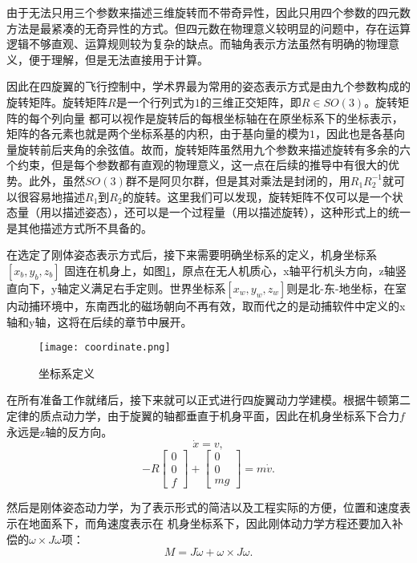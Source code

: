 由于无法只用三个参数来描述三维旋转而不带奇异性，因此只用四个参数的四元数方法是最紧凑的无奇异性的方式。但四元数在物理意义较明显的问题中，存在运算逻辑不够直观、运算规则较为复杂的缺点。而轴角表示方法虽然有明确的物理意义，便于理解，但是无法直接用于计算。

因此在四旋翼的飞行控制中，学术界最为常用的姿态表示方式是由九个参数构成的旋转矩阵。旋转矩阵$R$是一个行列式为$1$的三维正交矩阵，即$R\in SO(3)$。旋转矩阵的每个列向量  都可以视作是旋转后的每根坐标轴在在原坐标系下的坐标表示，矩阵的各元素也就是两个坐标系基的内积，由于基向量的模为$1$，因此也是各基向量旋转前后夹角的余弦值。故而，旋转矩阵虽然用九个参数来描述旋转有多余的六个约束，但是每个参数都有直观的物理意义，这一点在后续的推导中有很大的优势。此外，虽然$SO(3)$群不是阿贝尔群，但是其对乘法是封闭的，用$R_1R_2^{-1}$就可以很容易地描述$R_1$到$R_2$的旋转。这里我们可以发现，旋转矩阵不仅可以是一个状态量（用以描述姿态），还可以是一个过程量（用以描述旋转），这种形式上的统一是其他描述方式所不具备的。

在选定了刚体姿态表示方式后，接下来需要明确坐标系的定义，机身坐标系$[x_b,y_b,z_b]$ 固连在机身上，如图\ref{fig:1}，原点在无人机质心，x轴平行机头方向，z轴竖直向下，y轴定义满足右手定则。世界坐标系$[x_w,y_w,z_w]$则是北-东-地坐标，在室内动捕环境中，东南西北的磁场朝向不再有效，取而代之的是动捕软件中定义的x轴和y轴，这将在后续的章节中展开。
\begin{figure}[!h]
    \centering
    \texttt{[image: coordinate.png]}
    \caption{坐标系定义}
    \label{fig:1}
  \end{figure}

在所有准备工作就绪后，接下来就可以正式进行四旋翼动力学建模。根据牛顿第二定律的质点动力学，由于旋翼的轴都垂直于机身平面，因此在机身坐标系下合力$f$永远是z轴的反方向。
  \begin{equation}
    \dot x=v,
  \end{equation}
  \begin{equation}
    -R \begin{bmatrix} 0\\ 0\\ f \end{bmatrix}+\begin{bmatrix} 0\\ 0\\ mg\end{bmatrix}=m \dot v. 
    \label{equ:a}
  \end{equation}

然后是刚体姿态动力学，为了表示形式的简洁以及工程实际的方便，位置和速度表示在地面系下，而角速度表示在
机身坐标系下，因此刚体动力学方程还要加入补偿的$\omega \times J \omega$项：
  \begin{equation}
    M=J \dot\omega +\omega \times J \omega.
    \label{equ:M}
  \end{equation}

